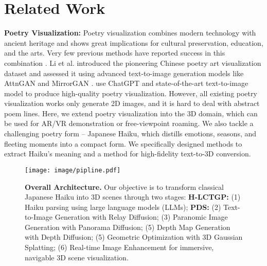 \section{Related Work}
\noindent\textbf{Poetry Visualization:}
    Poetry visualization combines modern technology with ancient heritage and shows great implications for cultural preservation, education, and the arts. Very few previous methods have reported success in this combination \cite{liu2018beyond,wang2019constructing,xu2018images}. Li et al. \cite{li2021paint4poem} introduced the pioneering Chinese poetry art visualization dataset and assessed it using advanced text-to-image generation models like AttnGAN \cite{xu2018attngan} and MirrorGAN \cite{qiao2019mirrorgan}. \cite{jiang2024poetry2image} use ChatGPT and state-of-the-art text-to-image model to produce high-quality poetry visualization. However, all existing poetry visualization works only generate 2D images, and it is hard to deal with abstract poem lines. Here, we extend poetry visualization into the 3D domain, which can be used for AR/VR demonstration or free-viewpoint roaming. We also tackle a challenging poetry form -- Japanese Haiku, which distills emotions, seasons, and fleeting moments into a compact form. We specifically designed methods to extract Haiku's meaning and a method for high-fidelity text-to-3D conversion.

\begin{figure*}[htbp]
\centering
\texttt{[image: image/pipline.pdf]}
\vspace{-0.3cm}
\caption{\textbf{Overall Architecture.} Our objective is to transform classical Japanese Haiku into 3D scenes through two stages: \textbf{H-LCTGP:} (1) Haiku parsing using large language models (LLMs); \textbf{PDS:} (2) Text-to-Image Generation with Relay Diffusion; (3) Paranomic Image Generation with Panorama Diffusion; (5) Depth Map Generation with Depth Diffusion; (5) Geometric Optimization with 3D Gaussian Splatting; (6) Real-time Image Enhancement for immersive, navigable 3D scene visualization.} 
\label{pipline}
\end{figure*}

